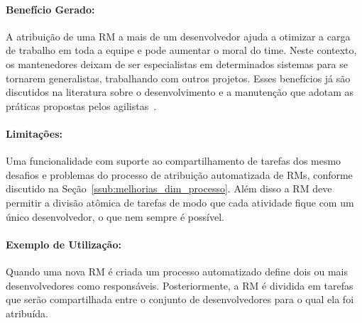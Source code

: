 \paragraph{Benefício Gerado:}
\label{par:papéis_afetados_s08}

A atribuição de uma RM a mais de um desenvolvedor ajuda a otimizar a carga de
trabalho em toda a equipe e pode aumentar o moral do time. Neste contexto, os
mantenedores deixam de ser especialistas em determinados sistemas para se
tornarem generalistas, trabalhando com outros projetos. Esses benefícios já são
discutidos na literatura sobre o desenvolvimento e a manutenção que adotam as
práticas propostas pelos agilistas~\cite{dybaa2008empirical,rudzki2009agile}.

\paragraph{Limitações:}
\label{par:limitacoes_s08}

Uma funcionalidade com suporte ao compartilhamento de tarefas dos mesmo desafios
e problemas do processo de atribuição automatizada de RMs, conforme discutido na
Seção~\ref{ssub:melhorias_dim_processo}. Além disso a RM deve permitir a divisão
atômica de tarefas de modo que cada atividade fique com um único desenvolvedor,
o que nem sempre é possível.

\paragraph{Exemplo de Utilização:}
\label{par:exemplo_de_utilização_s08}

Quando uma nova RM é criada um processo automatizado define dois ou mais
desenvolvedores como responsáveis. Posteriormente, a RM é dividida em tarefas
que serão compartilhada entre o conjunto de desenvolvedores para o qual ela foi
atribuída.




